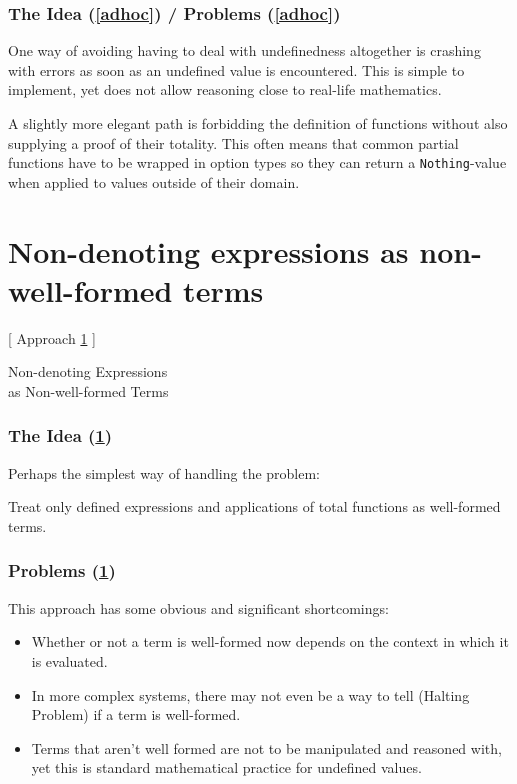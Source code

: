 \documentclass[aspectratio=169, usenames, dvipsnames]{beamer}
\begin{document}
\begin{frame}
\frametitle{The Idea (\ref{adhoc}) / Problems (\ref{adhoc})}

One way of avoiding having to deal with undefinedness altogether is crashing with errors as soon as an undefined value is encountered. This is simple to implement, yet does not allow reasoning close to real-life mathematics.
\bigskip

A slightly more elegant path is forbidding the definition of functions without also supplying a proof of their totality. This often means that common partial functions have to be wrapped in option types so they can return a \texttt{Nothing}-value when applied to values outside of their domain.
\end{frame}

\section{Non-denoting expressions as non-well-formed terms} \label{notwellformed}

\begin{frame}
\begin{center}
\Large [ Approach \ref{notwellformed} ]\bigskip

Non-denoting Expressions\\ as Non-well-formed Terms
\normalsize
\end{center}
\end{frame}

\begin{frame}
\frametitle{The Idea (\ref{notwellformed})}
Perhaps the simplest way of handling the problem:
\bigskip

Treat only defined expressions and applications of total functions as well-formed terms.
\end{frame}

\begin{frame}
\frametitle{Problems (\ref{notwellformed})}
This approach has some obvious and significant shortcomings:
\bigskip

\begin{itemize}
\item Whether or not a term is well-formed now depends on the context in which it is evaluated.\medskip

\item In more complex systems, there may not even be a way to tell (Halting Problem) if a term is well-formed.\medskip

\item Terms that aren't well formed are not to be manipulated and reasoned with, yet this is standard mathematical practice for undefined values.
\end{itemize}
\end{frame}
\end{document}
